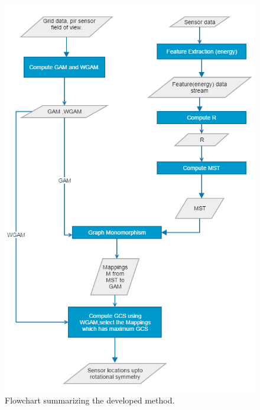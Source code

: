\begin{figure}
\includegraphics[scale=0.49]{./pics/methodSummary.png}
\caption{Flowchart summarizing the developed method.}
\label{fig:Summary}
\centering
\end{figure}



 






 


